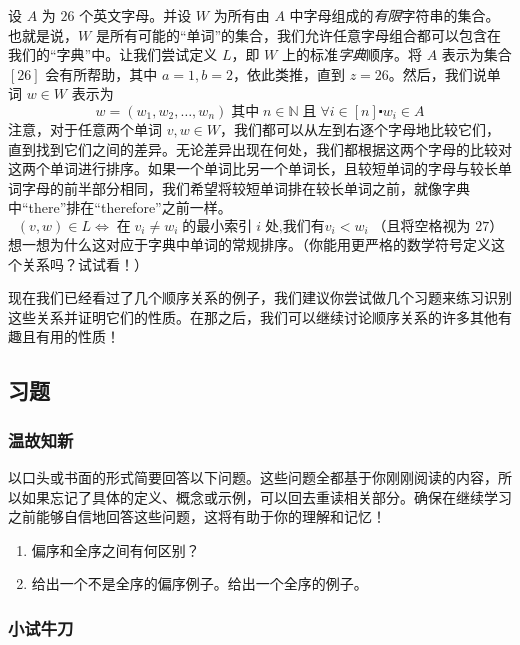 \begin{example}
    设 $A$ 为 $26$ 个英文字母。并设 $W$ 为所有由 $A$ 中字母组成的\emph{有限}字符串的集合。也就是说，$W$ 是所有可能的``单词''的集合，我们允许任意字母组合都可以包含在我们的``字典''中。让我们尝试定义 $L$，即 $W$ 上的标准\emph{字典}顺序。将 $A$ 表示为集合 $[26]$ 会有所帮助，其中 $a = 1, b = 2$，依此类推，直到 $z = 26$。然后，我们说单词 $w \in W$ 表示为
    \[w = (w_1, w_2, \dots , w_n) \;\text{其中}\; n \in \mathbb{N} \;\text{且}\; \forall i \in [n] \centerdot w_i \in A\]
    注意，对于任意两个单词 $v, w \in W$，我们都可以从左到右逐个字母地比较它们，直到找到它们之间的差异。无论差异出现在何处，我们都根据这两个字母的比较对这两个单词进行排序。如果一个单词比另一个单词长，且较短单词的字母与较长单词字母的前半部分相同，我们希望将较短单词排在较长单词之前，就像字典中``there''排在``therefore''之前一样。
    \[(v, w) \in L \iff \;\text{在}\; v_i \ne w_i \;\text{的最小索引}\; i \;\text{处,我们有} v_i < w_i \;\text{（且将空格视为 27）}\]
    想一想为什么这对应于字典中单词的常规排序。（你能用更严格的数学符号定义这个关系吗？试试看！）
\end{example}

现在我们已经看过了几个顺序关系的例子，我们建议你尝试做几个习题来练习识别这些关系并证明它们的性质。在那之后，我们可以继续讨论顺序关系的许多其他有趣且有用的性质！

\subsection{习题}

\subsubsection*{温故知新}

以口头或书面的形式简要回答以下问题。这些问题全都基于你刚刚阅读的内容，所以如果忘记了具体的定义、概念或示例，可以回去重读相关部分。确保在继续学习之前能够自信地回答这些问题，这将有助于你的理解和记忆！

\begin{enumerate}[label=(\arabic*)]
    \item 偏序和全序之间有何区别？
    \item 给出一个不是全序的偏序例子。给出一个全序的例子。
\end{enumerate}

\subsubsection*{小试牛刀}

